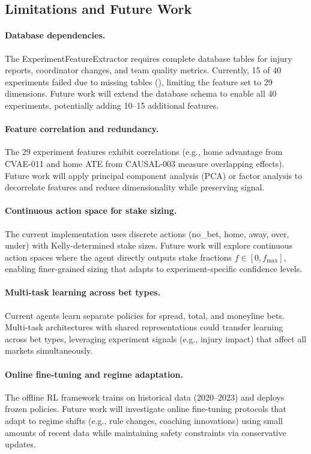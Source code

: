 \subsection{Limitations and Future Work}

\paragraph{Database dependencies.}
The ExperimentFeatureExtractor requires complete database tables for injury reports, coordinator changes, and team quality metrics. Currently, 15 of 40 experiments failed due to missing tables (), limiting the feature set to 29 dimensions. Future work will extend the database schema to enable all 40 experiments, potentially adding 10--15 additional features.

\paragraph{Feature correlation and redundancy.}
The 29 experiment features exhibit correlations (e.g., home advantage from CVAE-011 and home ATE from CAUSAL-003 measure overlapping effects). Future work will apply principal component analysis (PCA) or factor analysis to decorrelate features and reduce dimensionality while preserving signal.

\paragraph{Continuous action space for stake sizing.}
The current implementation uses discrete actions (no\_bet, home, away, over, under) with Kelly-determined stake sizes. Future work will explore continuous action spaces where the agent directly outputs stake fractions $f \in [0, f_{\max}]$, enabling finer-grained sizing that adapts to experiment-specific confidence levels.

\paragraph{Multi-task learning across bet types.}
Current agents learn separate policies for spread, total, and moneyline bets. Multi-task architectures with shared representations could transfer learning across bet types, leveraging experiment signals (e.g., injury impact) that affect all markets simultaneously.

\paragraph{Online fine-tuning and regime adaptation.}
The offline RL framework trains on historical data (2020--2023) and deploys frozen policies. Future work will investigate online fine-tuning protocols that adapt to regime shifts (e.g., rule changes, coaching innovations) using small amounts of recent data while maintaining safety constraints via conservative updates.